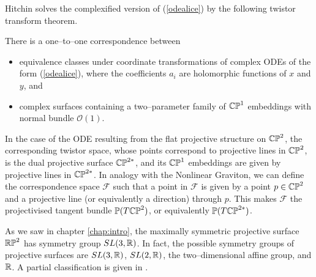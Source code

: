 Hitchin \cite{hitchin} solves the complexified version of (\ref{odealice}) by the following twistor transform theorem.
\begin{theo}
There is a one--to--one correspondence between
\begin{itemize}
\item equivalence classes under coordinate transformations of complex ODEs of the form (\ref{odealice}), where the coefficients $a_i$ are holomorphic functions of $x$ and $y$, and
\item complex surfaces containing a two--parameter family of $\mathbb{CP}^1$ embeddings with normal bundle $\mathcal{O}(1)$.
\end{itemize}
\end{theo}
\noindent In the case of the ODE resulting from the flat projective structure on $\mathbb{CP}^2$, the corresponding twistor space, whose points correspond to projective lines in $\mathbb{CP}^2$, is the dual projective surface $\mathbb{CP}^{2*}$, and its $\mathbb{CP}^1$ embeddings are given by projective lines in $\mathbb{CP}^{2*}$. In analogy with the Nonlinear Graviton, we can define the correspondence space $\mathcal{F}$ such that a point in $\mathcal{F}$ is given by a point $p\in\mathbb{CP}^2$ and a projective line (or equivalently a direction) through $p$. This makes $\mathcal{F}$ the projectivised tangent bundle $\mathbb{P}(T\mathbb{CP}^2)$, or equivalently $\mathbb{P}(T\mathbb{CP}^{2*})$.

As we saw in chapter \ref{chap:intro}, the maximally symmetric projective surface $\mathbb{RP}^2$ has symmetry group $SL(3,\mathbb{R})$. In fact, the possible symmetry groups of projective surfaces are $SL(3, \mathbb{R})$, $SL(2,\mathbb{R})$, the two--dimensional affine group, and $\mathbb{R}$. A partial classification is given in \cite{Bryant}.

